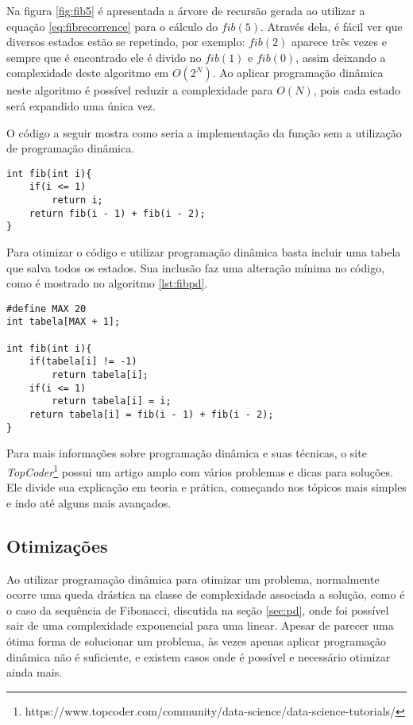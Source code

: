 Na figura \ref{fig:fib5} é apresentada a árvore de recursão gerada ao utilizar a equação \ref{eq:fibrecorrence} para o cálculo do $fib(5)$. Através dela, é fácil ver que diversos estados estão se repetindo, por exemplo: $fib(2)$ aparece três vezes e sempre que é encontrado ele é divido no $fib(1)$ e $fib(0)$, assim deixando a  complexidade deste algoritmo em $O(2^{N})$. Ao aplicar programação dinâmica neste algoritmo é possível reduzir a complexidade para $O(N)$, pois cada estado será expandido uma única vez.

O código a seguir mostra como seria a implementação da função sem a utilização de programação dinâmica.
\begin{lstlisting}[caption={Implementação Fibonacci sem programação dinâmica},label={lst:fibsimples}]
int fib(int i){
	if(i <= 1)
		return i;
	return fib(i - 1) + fib(i - 2);
}

\end{lstlisting}

Para otimizar o código e utilizar programação dinâmica basta incluir uma tabela que salva todos os estados. Sua inclusão faz uma alteração mínima no código, como é mostrado no algoritmo \ref{lst:fibpd}.


\begin{lstlisting}[caption={Implementação Fibonacci com programação dinâmica},label={lst:fibpd}]
#define MAX 20 
int tabela[MAX + 1]; 
					 					 
int fib(int i){
	if(tabela[i] != -1) 
		return tabela[i];
	if(i <= 1)
		return tabela[i] = i;
	return tabela[i] = fib(i - 1) + fib(i - 2);
}
\end{lstlisting}

Para mais informações sobre programação dinâmica e suas técnicas, o site \textit{TopCoder}\footnote{https://www.topcoder.com/community/data-science/data-science-tutorials/} possui um artigo amplo com vários problemas e dicas para soluções. Ele divide sua explicação em teoria e prática, começando nos tópicos mais simples e indo até alguns mais avançados.

\subsection{Otimizações}

Ao utilizar programação dinâmica para otimizar um problema, normalmente ocorre uma queda drástica na classe de complexidade associada a solução, como é o caso da sequência de Fibonacci, discutida na seção \ref{sec:pd}, onde foi possível sair de uma complexidade exponencial para uma linear. Apesar de parecer uma ótima forma de solucionar um problema, às vezes apenas aplicar programação dinâmica não é suficiente, e existem casos onde é possível e necessário otimizar ainda mais.

